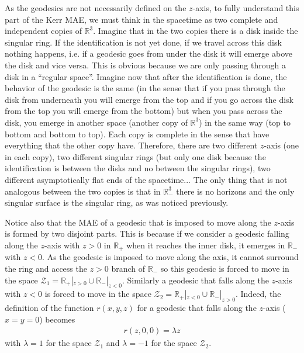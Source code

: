 As the geodesics are not necessarily defined on the $z$-axis, to fully understand this part of the Kerr \gls{MAE}, we must think in the spacetime as two complete and independent copies of $\mathbb{R}^3$. Imagine that in the two copies there is a disk inside the singular ring. If the identification is not yet done, if we travel across this disk nothing happens, i.e. if a geodesic goes from under the disk it will emerge above the disk and vice versa. This is obvious because we are only passing through a disk in a ``regular space''. Imagine now that after the identification is done, the behavior of the geodesic is the same (in the sense that if you pass through the disk from underneath you will emerge from the top and if you go across the disk from the top you will emerge from the bottom) but when you pass across the disk, you emerge in another space (another copy of $\mathbb{R}^3$) in the same way (top to bottom and bottom to top). Each copy is complete in the sense that have everything that the other copy have. Therefore, there are two different $z$-axis (one in each copy), two different singular rings (but only one disk because the identification is between the disks and no between the singular rings), two different asymptotically flat ends of the spacetime... The only thing that is not analogous between the two copies is that in $\mathbb{R}_-^3$ there is no horizons and the only singular surface is the singular ring, as was noticed previously.

Notice also that the \gls{MAE} of a geodesic that is imposed to move along the $z$-axis is formed by two disjoint parts. This is because if we consider a geodesic falling along the $z$-axis with $z>0$ in $\mathbb{R}_+$ when it reaches the inner disk, it emerges in $\mathbb{R}_-$ with $z<0$. As the geodesic is imposed to move along the axis, it cannot surround the ring and access the $z>0$ branch of $\mathbb{R}_-$ so this geodesic is forced to move in the space $\mathcal{Z}_1=\mathbb{R}_+|_{z>0} \cup \mathbb{R}_-|_{z<0}$. Similarly a geodesic that falls along the  $z$-axis with $z<0$ is forced to move in the space $\mathcal{Z}_2=\mathbb{R}_+|_{z<0} \cup \mathbb{R}_-|_{z>0}$. Indeed, the definition of the function $r(x,y,z)$ for a geodesic that falls along the $z$-axis ($x=y=0$) becomes
\begin{align}
 r(z,0,0)= \lambda z
\end{align}
with $\lambda=1$ for the space $\mathcal{Z}_1$ and $\lambda=-1$ for the space $\mathcal{Z}_2$.

 
\FloatBarrier
